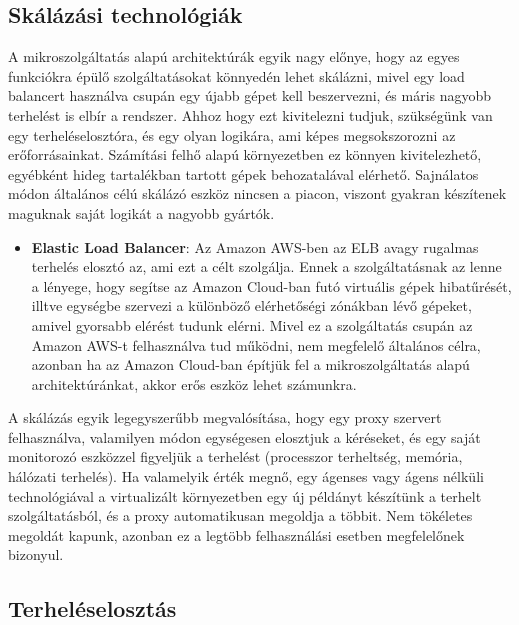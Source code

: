\documentclass[11pt,magyar,a4paper,twoside,]{report}
\providecommand{\tightlist}{%
  \setlength{\itemsep}{0pt}\setlength{\parskip}{0pt}}
\begin{document}
\subsection{Skálázási
technológiák}\label{skuxe1luxe1zuxe1si-technoluxf3giuxe1k}

A mikroszolgáltatás alapú architektúrák egyik nagy előnye, hogy az egyes
funkciókra épülő szolgáltatásokat könnyedén lehet skálázni, mivel egy
load balancert használva csupán egy újabb gépet kell beszervezni, és
máris nagyobb terhelést is elbír a rendszer. Ahhoz hogy ezt kivitelezni
tudjuk, szükségünk van egy terheléselosztóra, és egy olyan logikára, ami
képes megsokszorozni az erőforrásainkat. Számítási felhő alapú
környezetben ez könnyen kivitelezhető, egyébként hideg tartalékban
tartott gépek behozatalával elérhető. Sajnálatos módon általános célú
skálázó eszköz nincsen a piacon, viszont gyakran készítenek maguknak
saját logikát a nagyobb gyártók.

\begin{itemize}
\tightlist
\item
  \textbf{Elastic Load Balancer}\citep{elastic-load-balance}: Az Amazon
  AWS-ben az ELB avagy rugalmas terhelés elosztó az, ami ezt a célt
  szolgálja. Ennek a szolgáltatásnak az lenne a lényege, hogy segítse az
  Amazon Cloud-ban futó virtuális gépek hibatűrését, illtve egységbe
  szervezi a különböző elérhetőségi zónákban lévő gépeket, amivel
  gyorsabb elérést tudunk elérni. Mivel ez a szolgáltatás csupán az
  Amazon AWS-t felhasználva tud működni, nem megfelelő általános célra,
  azonban ha az Amazon Cloud-ban építjük fel a mikroszolgáltatás alapú
  architektúránkat, akkor erős eszköz lehet számunkra.
\end{itemize}

A skálázás egyik legegyszerűbb megvalósítása, hogy egy proxy szervert
felhasználva, valamilyen módon egységesen elosztjuk a kéréseket, és egy
saját monitorozó eszközzel figyeljük a terhelést (processzor terheltség,
memória, hálózati terhelés). Ha valamelyik érték megnő, egy ágenses vagy
ágens nélküli technológiával a virtualizált környezetben egy új példányt
készítünk a terhelt szolgáltatásból, és a proxy automatikusan megoldja a
többit. Nem tökéletes megoldát kapunk, azonban ez a legtöbb
felhasználási esetben megfelelőnek bizonyul.

\subsection{Terheléselosztás}\label{terheluxe9selosztuxe1s}
\end{document}
